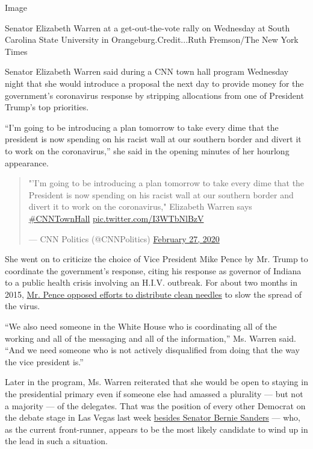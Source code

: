 Image

Senator Elizabeth Warren at a get-out-the-vote rally on Wednesday at
South Carolina State University in Orangeburg.Credit...Ruth Fremson/The
New York Times

Senator Elizabeth Warren said during a CNN town hall program Wednesday
night that she would introduce a proposal the next day to provide money
for the government's coronavirus response by stripping allocations from
one of President Trump's top priorities.

``I'm going to be introducing a plan tomorrow to take every dime that
the president is now spending on his racist wall at our southern border
and divert it to work on the coronavirus,'' she said in the opening
minutes of her hourlong appearance.

\begin{quote}
"'I'm going to be introducing a plan tomorrow to take every dime that
the President is now spending on his racist wall at our southern border
and divert it to work on the coronavirus," Elizabeth Warren says
\href{https://twitter.com/hashtag/CNNTownHall?src=hash\&ref_src=twsrc\%5Etfw}{\#CNNTownHall}
\href{https://t.co/I3WTbNlBzV}{pic.twitter.com/I3WTbNlBzV}

--- CNN Politics (@CNNPolitics)
\href{https://twitter.com/CNNPolitics/status/1232865628178067458?ref_src=twsrc\%5Etfw}{February
27, 2020}
\end{quote}

She went on to criticize the choice of Vice President Mike Pence by Mr.
Trump to coordinate the government's response, citing his response as
governor of Indiana to a public health crisis involving an H.I.V.
outbreak. For about two months in 2015,
\href{https://www.nytimes3xbfgragh.onion/2016/08/08/us/politics/mike-pence-needle-exchanges-indiana.html}{Mr.
Pence opposed efforts to distribute clean needles} to slow the spread of
the virus.

``We also need someone in the White House who is coordinating all of the
working and all of the messaging and all of the information,'' Ms.
Warren said. ``And we need someone who is not actively disqualified from
doing that the way the vice president is.''

Later in the program, Ms. Warren reiterated that she would be open to
staying in the presidential primary even if someone else had amassed a
plurality --- but not a majority --- of the delegates. That was the
position of every other Democrat on the debate stage in Las Vegas last
week
\href{https://www.nytimes3xbfgragh.onion/2020/02/22/us/politics/democratic-primary-dnc-superdelegates.html}{besides
Senator Bernie Sanders} --- who, as the current front-runner, appears to
be the most likely candidate to wind up in the lead in such a situation.

